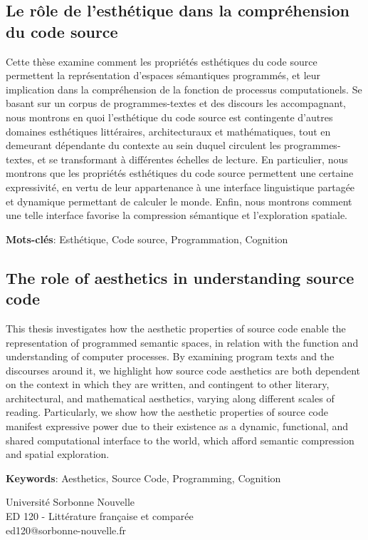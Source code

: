 \small
\subsection*{Le rôle de l'esthétique dans la compréhension du code source}


Cette thèse examine comment les propriétés esthétiques du code source permettent la représentation d'espaces sémantiques programmés, et leur implication dans la compréhension de la fonction de processus computationels. Se basant sur un corpus de programmes-textes et des discours les accompagnant, nous montrons en quoi l'esthétique du code source est contingente d'autres domaines esthétiques littéraires, architecturaux et mathématiques, tout en demeurant dépendante du contexte au sein duquel circulent les programmes-textes, et se transformant à différentes échelles de lecture. En particulier, nous montrons que les propriétés esthétiques du code source permettent une certaine expressivité, en vertu de leur appartenance à une interface linguistique partagée et dynamique permettant de calculer le monde. Enfin, nous montrons comment une telle interface favorise la compression sémantique et l'exploration spatiale.

\textbf{Mots-clés}: Esthétique, Code source, Programmation, Cognition
\linebreak
\linebreak
\subsection*{The role of aesthetics in understanding source code}

This thesis investigates how the aesthetic properties of source code enable the representation of programmed semantic spaces, in relation with the function and understanding of computer processes. By examining program texts and the discourses around it, we highlight how source code aesthetics are both dependent on the context in which they are written, and contingent to other literary, architectural, and mathematical aesthetics, varying along different scales of reading. Particularly, we show how the aesthetic properties of source code manifest expressive power due to their existence as a dynamic, functional, and shared computational interface to the world, which afford semantic compression and spatial exploration.

\textbf{Keywords}: Aesthetics, Source Code, Programming, Cognition

\normalsize

\clearpage
\null
\vspace{\fill}

Université Sorbonne Nouvelle\\
ED 120 - Littérature française et comparée\\
ed120@sorbonne-nouvelle.fr
